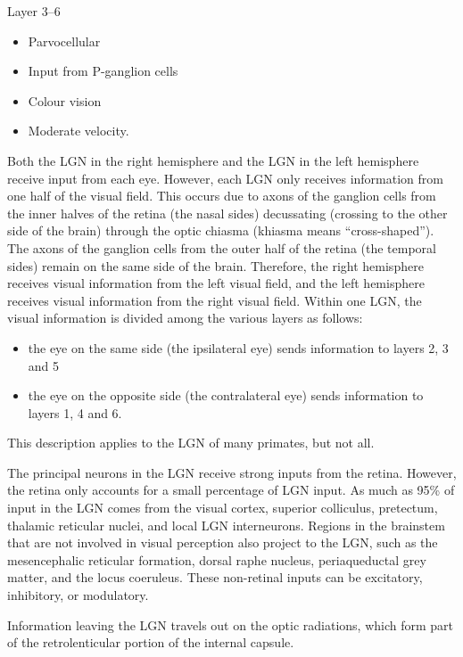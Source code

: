 Layer 3--6

\begin{itemize}
\tightlist
\item
  Parvocellular
\item
  Input from P-ganglion cells
\item
  Colour vision
\item
  Moderate velocity.
\end{itemize}

Both the LGN in the right hemisphere and the LGN in the left hemisphere receive input from each eye. However, each LGN only receives information from one half of the visual field. This occurs due to axons of the ganglion cells from the inner halves of the retina (the nasal sides) decussating (crossing to the other side of the brain) through the optic chiasma (khiasma means ``cross-shaped''). The axons of the ganglion cells from the outer half of the retina (the temporal sides) remain on the same side of the brain. Therefore, the right hemisphere receives visual information from the left visual field, and the left hemisphere receives visual information from the right visual field. Within one LGN, the visual information is divided among the various layers as follows:

\begin{itemize}
\tightlist
\item
  the eye on the same side (the ipsilateral eye) sends information to layers 2, 3 and 5
\item
  the eye on the opposite side (the contralateral eye) sends information to layers 1, 4 and 6.
\end{itemize}

This description applies to the LGN of many primates, but not all.

The principal neurons in the LGN receive strong inputs from the retina. However, the retina only accounts for a small percentage of LGN input. As much as 95\% of input in the LGN comes from the visual cortex, superior colliculus, pretectum, thalamic reticular nuclei, and local LGN interneurons. Regions in the brainstem that are not involved in visual perception also project to the LGN, such as the mesencephalic reticular formation, dorsal raphe nucleus, periaqueductal grey matter, and the locus coeruleus. These non-retinal inputs can be excitatory, inhibitory, or modulatory.

Information leaving the LGN travels out on the optic radiations, which form part of the retrolenticular portion of the internal capsule.

